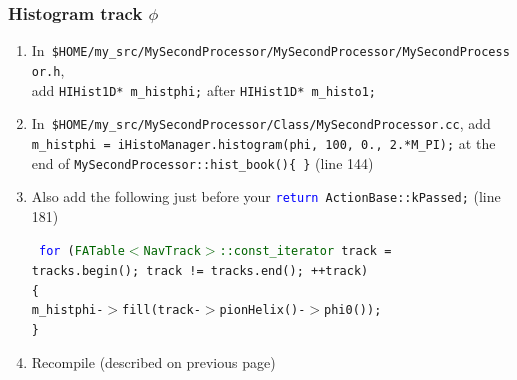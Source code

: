 \documentclass[12pt,compress]{beamer}
\begin{document}
\begin{frame}
\frametitle{Histogram track $\phi$}

\begin{enumerate}\setlength{\itemsep}{0.4 cm}
\item \mbox{In {\tt \scriptsize \$HOME/my\_src/MySecondProcessor/MySecondProcessor/MySecondProcessor.h}, \hspace{-1 cm}} \\ add
{\tt \scriptsize HIHist1D* m\_histphi;} after {\tt \scriptsize HIHist1D* m\_histo1;}
\item \mbox{In {\tt \scriptsize \$HOME/my\_src/MySecondProcessor/Class/MySecondProcessor.cc},} add
{\tt \scriptsize m\_histphi = iHistoManager.histogram(\rm \"\tt phi\rm \"\tt , 100, 0., 2.*M\_PI);}
at the end of {\tt \scriptsize MySecondProcessor::hist\_book()\{ \}} (line 144)
\item Also add the following just before your \mbox{\tt \scriptsize \textcolor{blue}{return} ActionBase::kPassed;} (line 181)

\vspace{0.25 cm}
\hspace{0.5 cm} \begin{minipage}{0.9\linewidth}
\tt \scriptsize
\textcolor{blue}{for}
(\textcolor{darkgreen}{FATable$<$NavTrack$>$::const\_iterator} track = \\
\mbox{\hspace{1 cm}} tracks.begin(); track != tracks.end(); ++track) \\
\{ \\
\mbox{\hspace{0.5 cm}}m\_histphi-$>$fill(track-$>$pionHelix()-$>$phi0()); \\
\}
\end{minipage}

\item Recompile (described on previous page)
\end{enumerate}
\end{frame}
\end{document}
